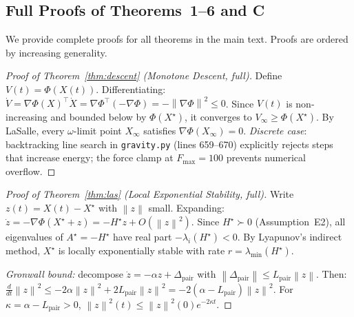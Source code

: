 \documentclass[11pt]{article}
\theoremstyle{definition}
\newcommand{\Xst}{X^{\star}}
\newcommand{\grad}{\nabla}
\newcommand{\Lpair}{L_{\mathrm{pair}}}
\newcommand{\lmin}{\lambda_{\min}}
\newcommand{\norm}[1]{\left\|#1\right\|}
\begin{document}
\begin{appendices}

\section{Full Proofs of Theorems~1--6 and C}
\label{app:proofs}

\setcounter{theorem}{0}

We provide complete proofs for all theorems in the main text.  Proofs are
ordered by increasing generality.

\begin{proof}[Proof of Theorem~\ref{thm:descent} (Monotone Descent, full)]
Define $V(t) = \Phi(X(t))$.  Differentiating:
$\dot V = \grad\Phi(X)^\top \dot X = \grad\Phi^\top(-\grad\Phi) = -\norm{\grad\Phi}^2 \le 0$.
Since $V(t)$ is non-increasing and bounded below by $\Phi(\Xst)$, it converges
to $V_\infty \ge \Phi(\Xst)$.  By LaSalle, every $\omega$-limit point $X_\infty$
satisfies $\grad\Phi(X_\infty) = 0$.  \textit{Discrete case}: backtracking line
search in \texttt{gravity.py} (lines 659--670) explicitly rejects steps that
increase energy; the force clamp at $F_{\max}=100$ prevents numerical overflow.
\end{proof}

\begin{proof}[Proof of Theorem~\ref{thm:las} (Local Exponential Stability, full)]
Write $z(t) = X(t) - \Xst$ with $\norm{z}$ small.  Expanding:
$\dot z = -\grad\Phi(\Xst + z) = -H^\star z + O(\norm{z}^2).$
Since $H^\star \succ 0$ (Assumption~E2), all eigenvalues of $A^\star = -H^\star$
have real part $-\lambda_i(H^\star) < 0$.  By Lyapunov's indirect method,
$\Xst$ is locally exponentially stable with rate $r = \lmin(H^\star)$.

\textit{Gronwall bound:} decompose $\dot z = -\alpha z + \Delta_{\mathrm{pair}}$
with $\norm{\Delta_{\mathrm{pair}}} \le \Lpair\norm{z}$.  Then:
$\frac{d}{dt}\norm{z}^2 \le -2\alpha\norm{z}^2 + 2\Lpair\norm{z}^2
= -2(\alpha - \Lpair)\norm{z}^2.$
For $\kappa = \alpha - \Lpair > 0$, $\norm{z}^2(t) \le \norm{z}^2(0)e^{-2\kappa t}$.
\end{proof}


\end{appendices}
\end{document}
